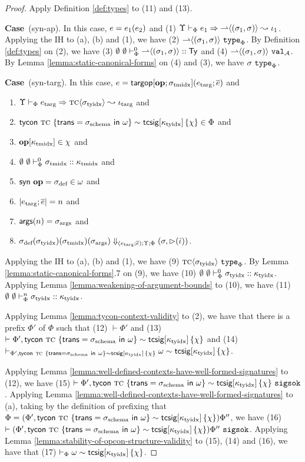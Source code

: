 \documentclass[12pt]{article}
\newcommand{\pfcase}[1]{\textbf{Case}~#1. }
\begin{document}
\begin{proof}
Apply Definition \ref{def:types} to (11) and (13).

\pfcase{(syn-ap)} In this case, $e=e_1(e_2)$ and (1) $\Upsilon \vdash_{\Phi} e_1 \Rightarrow {\rightharpoonup}\langle(\sigma_1, \sigma)\rangle \leadsto \iota_1$. Applying the IH to (a), (b) and (1), we have (2) ${\rightharpoonup}\langle(\sigma_1, \sigma)\rangle~\mathtt{type}_{\Phi}$. By Definition \ref{def:types} on (2), we have (3) $\emptyset~\emptyset \vdash_{\Phi}^{0} {\rightharpoonup}\langle(\sigma_1, \sigma)\rangle :: {\sf Ty}$ and (4) ${\rightharpoonup}\langle(\sigma_1, \sigma)\rangle~\mathtt{val}_{\mathcal{A}}$. By Lemma \ref{lemma:static-canonical-forms} on (4) and (3), we have $\sigma~\mathtt{type}_{\Phi}$. 

\pfcase{(syn-targ)} In this case, $e={\sf targop}[\textbf{op}; \sigma_\text{tmidx}](e_\text{targ}; \overline{e})$ and \begin{enumerate}[(1)]
\item $\Upsilon \vdash_{\Phi} e_\text{targ} \Rightarrow {\textsc{tc}}\langle\sigma_\text{tyidx}\rangle \leadsto \iota_\text{targ}$ and 
\item ${\sf tycon}~\textsc{tc} ~\{{\sf trans}=\sigma_\text{schema}~{\sf in}~\omega\} \sim {\sf tcsig}[\kappa_\text{tyidx}]\,\{\chi\} \in \Phi$ and
\item $\textbf{op}[\kappa_\text{tmidx}] \in \chi$ and
\item $\emptyset~\emptyset \vdash_{\Phi}^{0} \sigma_\text{tmidx} :: \kappa_\text{tmidx}$ and
\item ${\sf syn~}\textbf{op}={\sigma_\text{def}} \in \omega$ and
\item $|e_\text{targ}; \overline{e}| = n$ and
\item ${\sf args}(n)=\sigma_\text{args}$ and
\item $\sigma_\text{def}(\sigma_\text{tyidx})(\sigma_\text{tmidx})(\sigma_\text{args}) \Downarrow_{(e_\text{targ}; \overline{e});\Upsilon;\Phi} (\sigma, {\rhd}(\hat{\iota}))$.
\end{enumerate}

Applying the IH to (a), (b) and (1), we have (9) ${\textsc{tc}}\langle\sigma_\text{tyidx}\rangle~\mathtt{type}_{\Phi}$. By Lemma \ref{lemma:static-canonical-forms}.7 on (9), we have (10) $\emptyset~\emptyset \vdash_{\Phi}^{0} \sigma_\text{tyidx} :: \kappa_\text{tyidx}$. Applying Lemma \ref{lemma:weakening-of-argument-bounds} to (10), we have (11) $\emptyset~\emptyset \vdash_{\Phi}^{n} \sigma_\text{tyidx} :: \kappa_\text{tyidx}$.

Applying Lemma \ref{lemma:tycon-context-validity} to (2), we have that there is a prefix $\Phi'$ of $\Phi$ such that (12) $\vdash \Phi'$ and (13) $\vdash \Phi', {\sf tycon}~\textsc{tc} ~\{{\sf trans}=\sigma_\text{schema}~{\sf in}~\omega\} \sim {\sf tcsig}[\kappa_\text{tyidx}]\,\{\chi\}$ and (14) $\vdash_{\Phi', {\sf tycon}~\textsc{tc} ~\{{\sf trans}=\sigma_\text{schema}~{\sf in}~\omega\} \sim {\sf tcsig}[\kappa_\text{tyidx}]\,\{\chi\}} \omega \sim {\sf tcsig}[\kappa_\text{tyidx}]\,\{\chi\}$.

Applying Lemma \ref{lemma:well-defined-contexts-have-well-formed-signatures} to (12), we have (15) $\vdash \Phi', {\sf tycon}~\textsc{tc} ~\{{\sf trans}=\sigma_\text{schema}~{\sf in}~\omega\} \sim {\sf tcsig}[\kappa_\text{tyidx}]\,\{\chi\}~\mathtt{sigsok}$. Applying Lemma \ref{lemma:well-defined-contexts-have-well-formed-signatures} to (a), taking by the definition of prefixing that $\Phi=(\Phi', {\sf tycon}~\textsc{tc} ~\{{\sf trans}=\sigma_\text{schema}~{\sf in}~\omega\} \sim {\sf tcsig}[\kappa_\text{tyidx}]\,\{\chi\})\Phi''$, we have (16) $\vdash (\Phi', {\sf tycon}~\textsc{tc} ~\{{\sf trans}=\sigma_\text{schema}~{\sf in}~\omega\} \sim {\sf tcsig}[\kappa_\text{tyidx}]\,\{\chi\})\Phi''~\mathtt{sigsok}$. Applying Lemma \ref{lemma:stability-of-opcon-structure-validity} to (15), (14) and (16), we have that (17) $\vdash_{\Phi} \omega \sim {\sf tcsig}[\kappa_\text{tyidx}]\,\{\chi\}$.



\end{proof}
\end{document}
